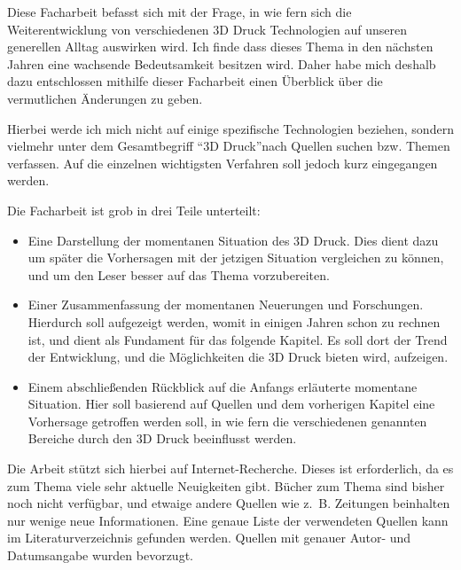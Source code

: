 Diese Facharbeit befasst sich mit der Frage, in wie fern sich die Weiterentwicklung von verschiedenen 3D Druck Technologien auf unseren generellen Alltag auswirken wird. Ich finde dass dieses Thema in den nächsten Jahren eine wachsende Bedeutsamkeit besitzen wird. Daher habe mich deshalb dazu entschlossen mithilfe dieser Facharbeit einen Überblick über die vermutlichen Änderungen zu geben.

Hierbei werde ich mich nicht auf einige spezifische Technologien beziehen, sondern vielmehr unter dem Gesamtbegriff \textquotedblleft 3D Druck\textquotedblright nach Quellen suchen bzw. Themen verfassen. Auf die einzelnen wichtigsten Verfahren soll jedoch kurz eingegangen werden.

Die Facharbeit ist grob in drei Teile unterteilt:
\begin{itemize}
\item Eine Darstellung der momentanen Situation des 3D Druck.
Dies dient dazu um später die Vorhersagen mit der jetzigen Situation vergleichen zu können, und um den Leser besser auf das Thema vorzubereiten.

\item Einer Zusammenfassung der momentanen Neuerungen und Forschungen. 
Hierdurch soll aufgezeigt werden, womit in einigen Jahren schon zu rechnen ist, und dient als Fundament für das folgende Kapitel. Es soll dort der Trend der Entwicklung, und die Möglichkeiten die 3D Druck bieten wird, aufzeigen.

\item Einem abschließenden Rückblick auf die Anfangs erläuterte momentane Situation. Hier soll basierend auf Quellen und dem vorherigen Kapitel eine Vorhersage getroffen werden soll, in wie fern die verschiedenen genannten Bereiche durch den 3D Druck beeinflusst werden.
\end{itemize}


Die Arbeit stützt sich hierbei auf Internet-Recherche. Dieses ist erforderlich, da es zum Thema viele sehr aktuelle Neuigkeiten gibt. Bücher zum Thema sind bisher noch nicht verfügbar, und etwaige andere Quellen wie z.~B. Zeitungen beinhalten nur wenige neue Informationen. Eine genaue Liste der verwendeten Quellen kann im Literaturverzeichnis gefunden werden. Quellen mit genauer Autor- und Datumsangabe wurden bevorzugt.